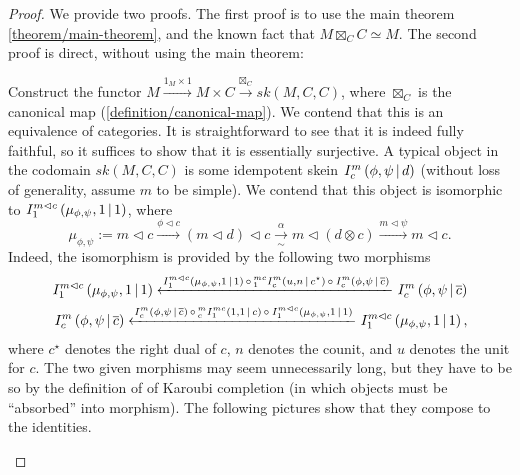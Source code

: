 \begin{proof}
  We provide two proofs. The first proof is to use the main theorem
  \ref{theorem/main-theorem}, and the known fact that
  $M \boxtimes_{C} C \simeq M$. The second proof is direct, without using the
  main theorem:

  Construct the functor
  $M \xrightarrow{1_{M} \times 1} M \times C \xrightarrow{\boxtimes_{C}} sk(M,C,C)$,
  where $\boxtimes_{C}$ is the canonical map (\ref{definition/canonical-map}).
  We contend that this is an equivalence of categories. It is straightforward
  to see that it is indeed fully faithful, so it suffices to show that it is
  essentially surjective. A typical object in the codomain $sk(M,C,C)$ is some
  idempotent skein ${}^{}_{} I^{m}_{c} \left( \phi, \psi \,\middle|\, d \right)$ (without loss of generality,
  assume $m$ to be simple). We contend that this object is isomorphic to
  ${}^{}_{} I^{m \lhd c}_{1} \left( \mu_{\phi, \psi}, 1 \,\middle|\, 1 \right)$, where
  \[
    \mu_{\phi,\psi} :=
    m \lhd c
    \xrightarrow{\phi \lhd c}
    (m \lhd d) \lhd c
    \xrightarrow[\sim]{\alpha}
    m \lhd (d \otimes c)
    \xrightarrow{m \lhd \psi}
    m \lhd c.
  \]
  Indeed, the isomorphism is provided by the following two morphisms
  \begin{align*}
    {}^{}_{} I^{m \lhd c}_{1} \left( \mu_{\phi, \psi}, 1 \,\middle|\, 1 \right)
    \xleftarrow{
    {}^{}_{} I^{m \lhd c}_{1} \left( \mu_{\phi, \psi}, 1 \,\middle|\, 1 \right)
    \, \circ \,
    {}^{mc}_{1} I^{m}_{c} \left( u, n \,\middle|\, c^{\star} \right)
    \, \circ \,
    {}^{}_{} I^{m}_{c} \left( \phi, \psi \,\middle|\, \overline{c} \right)}
    {}^{}_{} I^{m}_{c} \left( \phi, \psi \,\middle|\, \overline{c} \right)
    \\
    {}^{}_{} I^{m}_{c} \left( \phi, \psi \,\middle|\, \overline{c} \right)
    \xleftarrow{
    {}^{}_{} I^{m}_{c} \left( \phi, \psi \,\middle|\, \overline{c} \right)
    \, \circ \,
    {}^{m}_{c} I^{mc}_{1} \left( 1, 1 \,\middle|\, c \right)
    \, \circ \,
    {}^{}_{} I^{m \lhd c}_{1} \left( \mu_{\phi, \psi}, 1 \,\middle|\, 1 \right)
    }
    {}^{}_{} I^{m \lhd c}_{1} \left( \mu_{\phi, \psi}, 1 \,\middle|\, 1 \right),
  \end{align*}
  where $c^{\star}$ denotes the right dual of $c$, $n$ denotes the counit, and
  $u$ denotes the unit for $c$. The two given morphisms may seem unnecessarily
  long, but they have to be so by the definition of of Karoubi completion (in
  which objects must be ``absorbed'' into morphism). The following pictures
  show that they compose to the identities.


  \begin{center}
    
  \end{center}
\end{proof}

